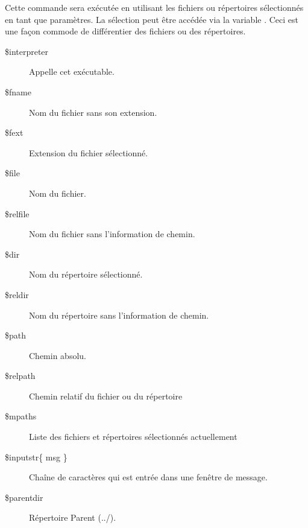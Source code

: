 Cette commande sera exécutée en utilisant les fichiers ou répertoires sélectionnés en tant que paramètres. La sélection peut être accédée via la variable . Ceci est une façon commode de différentier des fichiers ou des répertoires.


%
\begin{description}
\item[\$interpreter] Appelle cet exécutable.
\item[\$fname] Nom du fichier sans son extension.
\item[\$fext] Extension du fichier sélectionné.
\item[\$file] Nom du fichier.
\item[\$relfile] Nom du fichier sans l'information de chemin.
\item[\$dir] Nom du répertoire sélectionné.
\item[\$reldir] Nom du répertoire sans l'information de chemin.
\item[\$path] Chemin absolu.
\item[\$relpath] Chemin relatif du fichier ou du répertoire
\item[\$mpaths] Liste des fichiers et répertoires sélectionnés actuellement
\item[\$inputstr\{ msg \}] Chaîne de caractères qui est entrée dans une fenêtre de message.
\item[\$parentdir] Répertoire Parent (../).
\end{description}

%
%
%
%
%

